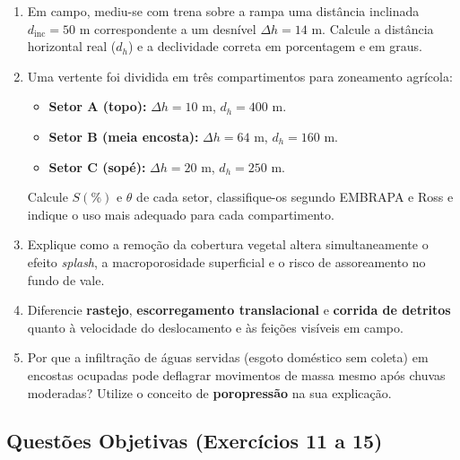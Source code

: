 \begin{enumerate}[leftmargin=1.8em, itemsep=4pt, resume]
  \item Em campo, mediu-se com trena sobre a rampa uma distância inclinada $d_{\text{inc}} = 50\text{ m}$ correspondente a um desnível $\Delta h = 14\text{ m}$. Calcule a distância horizontal real ($d_h$) e a declividade correta em porcentagem e em graus.
  \espacoResolucao[2.2cm]

  \item Uma vertente foi dividida em três compartimentos para zoneamento agrícola:
  \begin{itemize}[leftmargin=1.4em, itemsep=1pt]
    \item \textbf{Setor A (topo):} $\Delta h = 10\text{ m}$, $d_h = 400\text{ m}$.
    \item \textbf{Setor B (meia encosta):} $\Delta h = 64\text{ m}$, $d_h = 160\text{ m}$.
    \item \textbf{Setor C (sopé):} $\Delta h = 20\text{ m}$, $d_h = 250\text{ m}$.
  \end{itemize}
  Calcule $S(\%)$ e $\theta$ de cada setor, classifique-os segundo EMBRAPA e Ross e indique o uso mais adequado para cada compartimento.
  \espacoResolucao[2.5cm]

  \item Explique como a remoção da cobertura vegetal altera simultaneamente o efeito \textit{splash}, a macroporosidade superficial e o risco de assoreamento no fundo de vale.
  \espacoResolucao[2.0cm]

  \item Diferencie \textbf{rastejo}, \textbf{escorregamento translacional} e \textbf{corrida de detritos} quanto à velocidade do deslocamento e às feições visíveis em campo.
  \espacoResolucao[2.0cm]

  \item Por que a infiltração de águas servidas (esgoto doméstico sem coleta) em encostas ocupadas pode deflagrar movimentos de massa mesmo após chuvas moderadas? Utilize o conceito de \textbf{poropressão} na sua explicação.
  \espacoResolucao[2.0cm]
\end{enumerate}

\subsection*{Questões Objetivas (Exercícios 11 a 15)}

